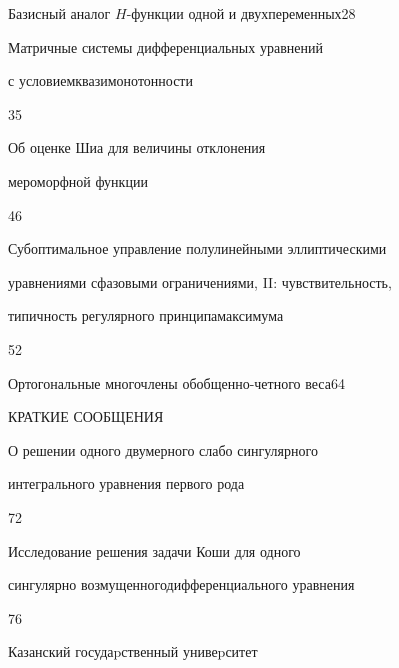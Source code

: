 

{Базисный аналог $H$-функции одной и двух\newline переменных}{28}




{Матричные системы дифференциальных уравнений


с условием\newline квазимонотонности}{35}




{Об оценке Шиа для величины отклонения


мероморфной функции}{46}




{Субоптимальное управление полулинейными эллиптическими


уравнениями с\newline фазовыми ограничениями, II: чувствительность,


типичность регулярного принципа\newline максимума}{52}




{Ортогональные многочлены обобщенно-четного веса}{64}








\bigskip





\centerline{КРАТКИЕ СООБЩЕНИЯ}


\bigskip







{О решении одного двумерного слабо сингулярного \newline


интегрального уравнения первого рода}{72}




{Исследование решения задачи Коши для одного


сингулярно возмущенного\newline дифференциального уравнения}{76}








\vfill


\noindent\raisebox{2pt}{\copyright} Казанский госудаpственный унивеpситет





